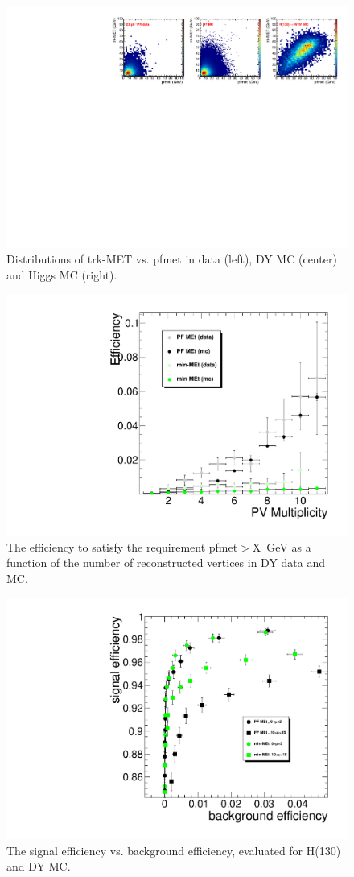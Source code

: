 \begin{figure}[hbt]
\begin{center}
\includegraphics[width=1\linewidth]{figures/met_scatter.pdf} 
\caption{\label{fig:met_scatter}\protect Distributions of trk-MET vs. pfmet in data (left), DY MC (center) and Higgs MC (right).}
\end{center}
\end{figure}

 
\begin{figure}[hbt]
\begin{center}
\includegraphics[width=0.3\linewidth]{figures/pfmet_minmet_Eff30.pdf} 
\caption{\label{fig:met_eff}\protect The efficiency to satisfy the requirement pfmet$>$X~GeV as a function
of the number of reconstructed vertices in DY data and MC.}
\end{center}
\end{figure}

 
\begin{figure}[hbt]
\begin{center}
\includegraphics[width=0.3\linewidth]{figures/SignalVsBkgrEfficiency.pdf} 
\caption{\label{fig:met_roc}\protect The signal efficiency vs. background efficiency, evaluated for H(130) and DY MC.}
\end{center}
\end{figure}



